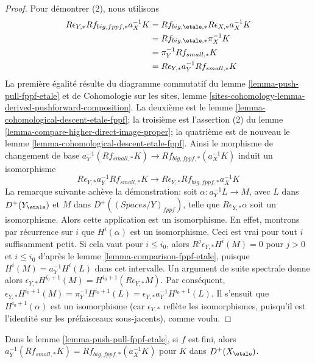 \begin{proof}
\medskip\noindent
Pour démontrer (2), nous utilisons
\begin{align*}
R\epsilon_{Y, *}Rf_{big, fppf, *}a_X^{-1}K
& =
Rf_{big, \etale, *}R\epsilon_{X, *}a_X^{-1}K \\
& =
Rf_{big, \etale, *}\pi_X^{-1}K \\
& =
\pi_Y^{-1}Rf_{small, *}K \\
& =
R\epsilon_{Y, *} a_Y^{-1}Rf_{small, *}K
\end{align*}
La première égalité résulte du diagramme commutatif du lemme
\ref{lemma-push-pull-fppf-etale} et de Cohomologie sur les sites, lemme
\ref{sites-cohomology-lemma-derived-pushforward-composition}.
La deuxième est le lemme \ref{lemma-cohomological-descent-etale-fppf}; la
troisième est l'assertion (2) du lemme
\ref{lemma-compare-higher-direct-image-proper}; la quatrième est de nouveau
le lemme \ref{lemma-cohomological-descent-etale-fppf}.
Ainsi le morphisme de changement de base
$a_Y^{-1}(Rf_{small, *}K) \to Rf_{big, fppf, *}(a_X^{-1}K)$
induit un isomorphisme
$$
R\epsilon_{Y, *}a_Y^{-1}Rf_{small, *}K \to
R\epsilon_{Y, *}Rf_{big, fppf, *}a_X^{-1}K
$$
La remarque suivante achève la démonstration: soit
$\alpha : a_Y^{-1}L \to M$, avec $L$ dans $D^+(Y_\etale)$ et $M$ dans
$D^+((\textit{Spaces}/Y)_{fppf})$, telle que $R\epsilon_{Y, *}\alpha$ soit un
isomorphisme. Alors cette application est un isomorphisme. En effet, montrons par
récurrence sur $i$ que $H^i(\alpha)$ est un isomorphisme. Ceci est vrai pour
tout $i$ suffisamment petit. Si cela vaut pour $i \leq i_0$, alors
$R^j\epsilon_{Y, *}H^i(M) = 0$ pour $j > 0$ et $i \leq i_0$ d'après le lemme
\ref{lemma-comparison-fppf-etale}, puisque
$H^i(M) = a_Y^{-1}H^i(L)$ dans cet intervalle. Un argument de suite spectrale
donne alors
$\epsilon_{Y, *}H^{i_0 + 1}(M) = H^{i_0 + 1}(R\epsilon_{Y, *}M)$.
Par conséquent, $\epsilon_{Y, *}H^{i_0 + 1}(M) =
\pi_Y^{-1}H^{i_0 + 1}(L) =
\epsilon_{Y, *}a_Y^{-1}H^{i_0 + 1}(L)$. Il s'ensuit que
$H^{i_0 + 1}(\alpha)$ est un isomorphisme (car $\epsilon_{Y, *}$ reflète les
isomorphismes, puisqu'il est l'identité sur les préfaisceaux sous-jacents),
comme voulu.
\end{proof}

\begin{lemma}
\label{lemma-finite-push-pull-fppf-etale}
Dans le lemme \ref{lemma-push-pull-fppf-etale}, si $f$ est fini, alors
$a_Y^{-1}(Rf_{small, *}K) = Rf_{big, fppf, *}(a_X^{-1}K)$
pour $K$ dans $D^+(X_\etale)$.
\end{lemma}

